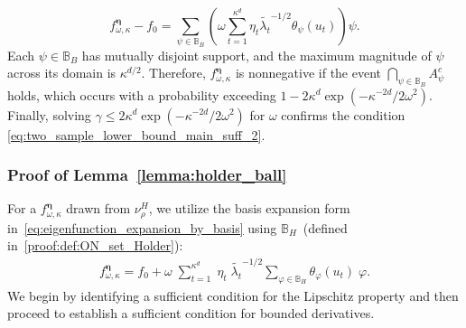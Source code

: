\documentclass[twoside,11pt]{article}
\newcommand{\dimDensity}{d} %
\newcommand{\ONset}{\mathbb{B}}
\newcommand{\binNum}{\kappa}           %
\newcommand{\coef}{\theta}
\begin{document}
\begin{appendix}
	\[
	f^{\boldsymbol{\eta}}_{\omega, \binNum} - f_0 = \sum_{\psi \in \ONset_{B}} \left( \omega \sum_{t=1}^{\binNum^{\dimDensity}} \eta_t \tilde{\lambda_t}^{-1/2} \coef_{\psi}(u_t) \right) \psi.
	\]
	Each \( \psi \in \ONset_{B} \) has mutually disjoint support, and the maximum magnitude of \( \psi \) across its domain is \( \binNum^{\dimDensity/2} \). Therefore, \( f^{\boldsymbol{\eta}}_{\omega, \binNum} \) is nonnegative if the event \( \bigcap_{\psi \in \ONset_{B}} A_{\psi}^c \) holds, which occurs with a probability exceeding \( 1-2 \binNum^\dimDensity \exp(-\kappa^{-2\dimDensity}/2\omega^2) \).
	Finally, solving \( \gamma \leq 2 \binNum^\dimDensity \exp(-\binNum^{-2\dimDensity}/2\omega^2) \) for \( \omega \) confirms the condition  \eqref{eq:two_sample_lower_bound_main_suff_2}.
	\subsubsection{Proof of Lemma~\ref{lemma:holder_ball}}
	For a $f^{{\boldsymbol{\eta}}}_{\omega, \binNum}$ 
	drawn from $\nu_\rho^H$,
	we utilize the basis expansion form in~\eqref{eq:eigenfunction_expansion_by_basis} using $\ONset_{H}$~(defined in~\eqref{proof:def:ON_set_Holder}):
	\begin{align*}
		f^{{\boldsymbol{\eta}}}_{\omega, \binNum}
		=
		f_0
		+
		\omega \;
		\sum_{t=1}^{\binNum^{\dimDensity}}
		\; \eta_t \; \tilde{\lambda_t}^{-1/2}
		\sum_{
			\varphi \in \ONset_{H}
		}
		\coef_{\varphi}(u_t) \;\varphi.
	\end{align*}
	We begin by identifying a sufficient condition for the Lipschitz property and then proceed to establish a sufficient condition for bounded derivatives.

\end{appendix}
\end{document}
